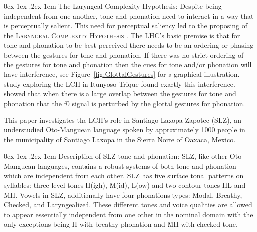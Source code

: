 \documentclass[11pt, letterpaper]{article}
\makeatletter
\renewcommand{\paragraph}{%
  \@startsection{paragraph}{4}%
  {\z@}{0ex \@plus 1ex \@minus .2ex}{-1em}%
  {\normalfont\normalsize\bfseries}%
}
\makeatother
\begin{document}
\paragraph{The Laryngeal Complexity Hypothesis:} Despite being independent from one another, tone and phonation need to interact in a way that is perceptually salient. This need for perceptual saliency led to the proposing of the \textsc{Laryngeal Complexity Hypothesis} \citep[LCH;][]{silvermanLaryngealComplexityOtomanguean1997,blankenshipTimeCourseBreathiness1997,blankenshipTimingNonmodalPhonation2002}. The LHC's basic premise is that for tone and phonation to be best perceived there needs to be an ordering or phasing between the gestures for tone and phonation. If there was no strict ordering of the gestures for tone and phonation then the cues for tone and/or phonation will have interference, see Figure~\ref{fig:GlottalGestures} for a graphical illustration.  study exploring the LCH in Itunyoso Trique found exactly this interference. \citeauthor{dicanioCoarticulationToneGlottal2012} showed that when there is a large overlap between the gestures for tone and phonation that the f0 signal is perturbed by the glottal gestures for phonation. 

This paper investigates the LCH's role in Santiago Laxopa Zapotec (SLZ), an understudied Oto-Manguean language spoken by approximately 1000 people in the municipality of Santiago Laxopa in the Sierra Norte of Oaxaca, Mexico. 

\paragraph{Description of SLZ tone and phonation:} 
SLZ, like other Oto-Manguean languages, contains a robust systems of both tone and phonation which are independent from each other. SLZ has five surface tonal patterns on syllables: three level tones H(igh), M(id), L(ow) and two contour tones HL and MH. Vowels in SLZ, additionally have four phonations types: Modal, Breathy, Checked, and Laryngealized. 
These different tones and voice qualities are allowed to appear essentially independent from one other in the nominal domain with the only exceptions being H with breathy phonation and MH with checked tone.
\end{document}
